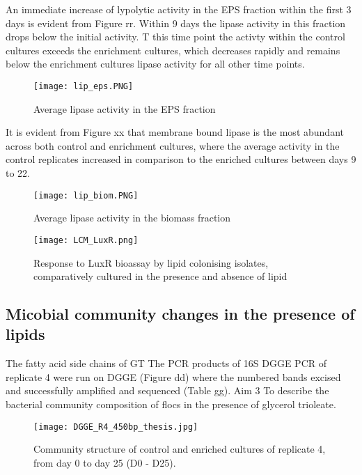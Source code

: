 \documentclass[11pt]{article}
\begin{document}
An immediate increase of lypolytic activity in the EPS  fraction within the first 3 days is evident from Figure rr. Within 9 days the lipase activity in this fraction drops below the initial activity. T this time point the activty within the control cultures exceeds the enrichment cultures, which decreases rapidly and remains below the enrichment cultures lipase activity for all other time points.

\begin{figure}
\texttt{[image: lip\_eps.PNG]}
\caption{Average lipase activity in the EPS fraction}
\end{figure}

It is evident from  Figure xx that membrane bound lipase is the most abundant across both control and enrichment cultures, where the average activity in the control replicates increased in comparison to the enriched cultures between days 9 to 22.

\begin{figure}
\texttt{[image: lip\_biom.PNG]}
\caption{Average lipase activity in the biomass fraction}
\end{figure}
\FloatBarrier



\begin{figure}
\texttt{[image: LCM\_LuxR.png]}
\caption{Response to LuxR bioassay by lipid colonising isolates, comparatively cultured in the presence and absence of lipid }
\end{figure}
\FloatBarrier

\subsection{Micobial community changes in the presence of lipids}
The fatty acid side chains of GT
The PCR products of 16S DGGE PCR  of replicate 4 were run on DGGE (Figure dd) where the numbered bands excised and successfully amplified and sequenced (Table gg). 
Aim 3 To describe the bacterial community composition of flocs in the presence of glycerol trioleate.

\begin{figure}
\texttt{[image: DGGE\_R4\_450bp\_thesis.jpg]}
\caption{Community structure of control and enriched cultures of replicate 4, from day 0 to day 25 (D0 - D25).}
\end{figure}
\end{document}
